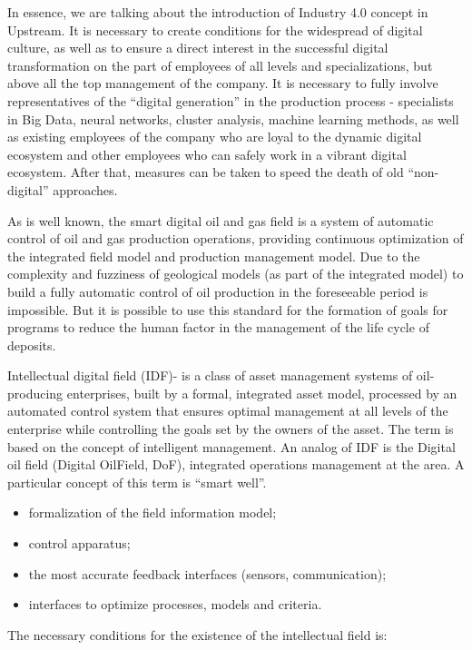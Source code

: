 \documentclass[12pt]{report}
\theoremstyle{definition}
\providecommand{\tightlist}{%
	\setlength{\itemsep}{0pt}\setlength{\parskip}{0pt}}
\begin{document}
In essence, we are talking about the introduction of Industry 4.0 concept in Upstream.
It is necessary to create conditions for the widespread of digital culture, as well as to ensure a direct interest in the successful digital transformation on the part of employees of all levels and specializations, but above all the top management of the company.
It is necessary to fully involve representatives of the ``digital generation'' in the production process - specialists in Big Data, neural networks, cluster analysis, machine learning methods, as well as existing employees of the company who are loyal to the dynamic digital ecosystem and other employees who can safely work in a vibrant digital ecosystem.
After that, measures can be taken to speed the death of old ``non-digital'' approaches.

As is well known, the smart digital oil and gas field is a system of automatic control of oil and gas production operations, providing continuous optimization of the integrated field model and production management model.
Due to the complexity and fuzziness of geological models (as part of the integrated model) to build a fully automatic control of oil production in the foreseeable period is impossible.
But it is possible to use this standard for the formation of goals for programs to reduce the human factor in the management of the life cycle of deposits.

Intellectual digital field (IDF)- is a class of asset management systems of oil-producing enterprises, built by a formal, integrated asset model, processed by an automated control system that ensures optimal management at all levels of the enterprise while controlling the goals set by the owners of the asset.
The term is based on the concept of intelligent management.
An analog of IDF is the Digital oil field (Digital OilField, DoF), integrated operations management at the area.
A particular concept of this term is ``smart well''.

\begin{itemize}
	\tightlist
	\item formalization of the field information model;
	\item control apparatus; 
	\item the most accurate feedback interfaces (sensors, communication);
	\item interfaces to optimize processes, models and criteria.
\end{itemize}

The necessary conditions for the existence of the intellectual field is:
\end{document}
